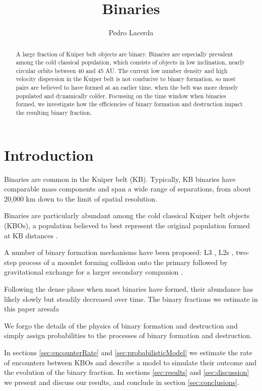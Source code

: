 \documentclass[a4paper,12pt]{article}
\begin{document}
\title{Binaries}
\author{Pedro Lacerda}

\maketitle

\begin{abstract}
A large fraction of Kuiper belt objects are binary. Binaries are especially prevalent among the cold classical population, which consists of objects in low inclination, nearly circular orbits between 40 and 45 AU.  The current low number density and high velocity dispersion in the Kuiper belt is not conducive to binary formation, so most pairs are believed to have formed at an earlier time, when the belt was more densely populated and dynamically colder.  Focussing on the time window when binaries formed, we investigate how the efficiencies of binary formation and destruction impact the resulting binary fraction.
\end{abstract}

\section{Introduction}

Binaries are common in the Kuiper belt (KB). Typically, KB binaries have comparable mass components and span a wide range of separations, from about 20,000 km down to the limit of spatial resolution.

Binaries are particularly abundant among the cold classical Kuiper belt objects (KBOs), a population believed to best represent the original population formed at KB distances \cite{2010ApJ...722L.204Parker,2018Icar..306..319Gomes}.

A number of binary formation mechanisms have been proposed: L3 \cite{2002Natur.420..643G}, L2s \cite{2002Natur.420..643G}, two-step process of a moonlet forming collision onto the primary followed by gravitational exchange for a larger secondary companion \cite{2004Natur.427..518F}.

Following the dense phase when most binaries have formed, their abundance has likely slowly but steadily decreased over time.  The binary fractions we estimate in this paper aresafa

We forgo the details of the physics of binary formation and destruction and simply assign probabilities to the processes of binary formation and destruction.

In sections \ref{sec:encounterRate} and \ref{sec:probabilisticModel} we estimate the rate of encounters between KBOs and describe a model to simulate their outcome and the evolution of the binary fraction. In sections \ref{sec:results} and \ref{sec:discussion} we present and discuss our results, and conclude in section \ref{sec:conclusions}.
\end{document}
